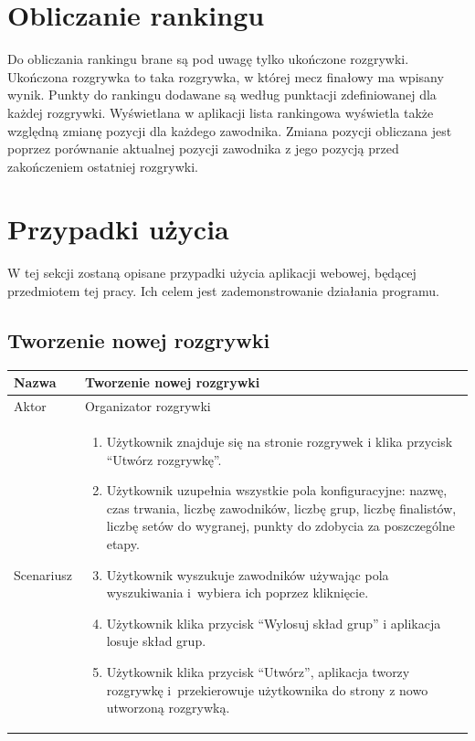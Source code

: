 \documentclass[shortabstract]{iithesis}
\begin{document}
\section{Obliczanie rankingu}
Do obliczania rankingu brane są pod uwagę tylko ukończone rozgrywki.
Ukończona rozgrywka to taka rozgrywka, w której mecz finałowy ma wpisany wynik.
Punkty do rankingu dodawane są według punktacji zdefiniowanej dla każdej rozgrywki.
Wyświetlana w aplikacji lista rankingowa wyświetla także względną zmianę pozycji dla każdego zawodnika.
Zmiana pozycji obliczana jest poprzez porównanie aktualnej pozycji zawodnika z jego pozycją przed zakończeniem ostatniej rozgrywki.



\section{Przypadki użycia}
W tej sekcji zostaną opisane przypadki użycia aplikacji webowej, będącej przedmiotem tej pracy.
Ich celem jest zademonstrowanie działania programu.
\subsection{Tworzenie nowej rozgrywki}
\begin{tabular}{|l|p{12cm}|}
    \hline
    Nazwa      & Tworzenie nowej rozgrywki                                                                                                                                                              \\
    \hline
    Aktor      & Organizator rozgrywki                                                                                                                                                                  \\
    \hline
    Scenariusz &
    \begin{enumerate}[nosep,leftmargin=*,rightmargin=8pt,before=\vspace{-7.5pt},after=\vspace{-8pt}]
        \item Użytkownik znajduje się na stronie rozgrywek i klika przycisk ``Utwórz rozgrywkę''.
        \item Użytkownik uzupełnia wszystkie pola konfiguracyjne: nazwę, czas trwania, liczbę zawodników, liczbę grup, liczbę finalistów, liczbę setów do wygranej, punkty do zdobycia za poszczególne etapy.
        \item Użytkownik wyszukuje zawodników używając pola wyszukiwania i~wybiera ich poprzez kliknięcie.
        \item Użytkownik klika przycisk ``Wylosuj skład grup'' i aplikacja losuje skład grup.
        \item Użytkownik klika przycisk ``Utwórz'', aplikacja tworzy rozgrywkę i~przekierowuje użytkownika do strony z nowo utworzoną rozgrywką.
    \end{enumerate} \\
    \hline
\end{tabular}
\end{document}
